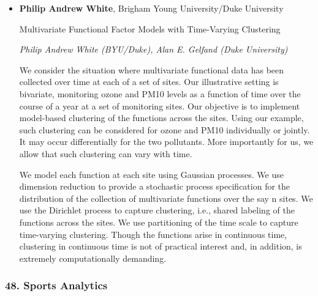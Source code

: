 \begin{itemize}
\item \textbf{Philip Andrew White}, Brigham Young University/Duke University

Multivariate Functional Factor Models with Time-Varying Clustering

\emph{\footnotesize Philip Andrew White (BYU/Duke), Alan E. Gelfand (Duke University)}

We consider the situation where multivariate functional data has been collected over time at each of a set of sites. Our illustrative setting is bivariate, monitoring ozone and PM10 levels as a function of time over the course of a year at a set of monitoring sites. Our objective is to implement model-based clustering of the functions across the sites. Using our example, such clustering can be considered for ozone and PM10 individually or jointly. It may occur differentially for the two pollutants. More importantly for us, we allow that such clustering can vary with time.

We model each function at each site using Gaussian processes. We use dimension reduction to provide a stochastic process specification for the distribution of the collection of multivariate functions over the say n sites. We use the Dirichlet process to capture clustering, i.e., shared labeling of the functions across the sites. We use partitioning of the time scale to capture time-varying clustering. Though the functions arise in continuous time, clustering in continuous time is not of practical interest and, in addition, is extremely computationally demanding.

\end{itemize}

\subsubsection*{48. Sports Analytics}

